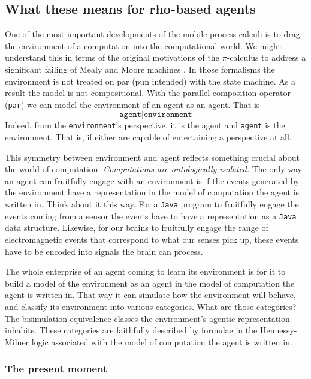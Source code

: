 \documentclass{article}
\newcommand{\code}[1]{\texttt{#1}}
\begin{document}
\subsection{What these means for rho-based agents}

One of the most important developments of the mobile process calculi is to drag the environment of a computation into the computational world. We might understand this in terms of the original motivations of the $\pi$-calculus to address a significant failing of Mealy and Moore machines \cite{enwiki:1325231846}. In those formalisms the environment is not treated on par (pun intended) with the state machine. As a result the model is not compositional. With the parallel composition operator (\code{par}) we can model the environment of an agent as an agent. That is
\[
\code{agent|environment}
\]
Indeed, from the \code{environment}'s perspective, it is the agent and \code{agent} is the environment. That is, if either are capable of entertaining a perspective at all.

\medskip

This symmetry between environment and agent reflects something crucial about the world of computation. \emph{Computations are ontologically isolated.} The only way an agent can fruitfully engage with an environment is if the events generated by the environment have a representation in the model of computation the agent is written in. Think about it this way. For a \code{Java} program to fruitfully engage the events coming from a sensor the events have to have a representation as a \code{Java} data structure. Likewise, for our brains to fruitfully engage the range of electromagnetic events that correspond to what our senses pick up, these events have to be encoded into signals the brain can process.

\medskip

The whole enterprise of an agent coming to learn its environment is for it to build a model of the environment as an agent in the model of computation the agent is written in. That way it can simulate how the environment will behave, and classify its environment into various categories. What are those categories? The bisimulation equivalence classes the environment's agentic representation inhabits. These categories are faithfully described by formulae in the Hennessy-Milner logic associated with the model of computation the agent is written in.

\subsubsection{The present moment}
\end{document}
